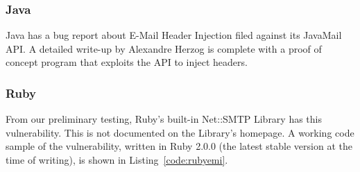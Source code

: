 \subsubsection{Java} 
Java has a bug report about E-Mail Header Injection filed against its JavaMail API. A detailed write-up by Alexandre Herzog \cite{Herzog.2014} is complete with a proof of concept program that exploits the API to inject headers.

\subsubsection{Ruby}
From our preliminary testing, Ruby's built-in Net::SMTP Library has this vulnerability. This is not documented on the Library's homepage.
A working code sample of the vulnerability, written in Ruby 2.0.0 (the latest stable version at the time of writing), is shown in Listing~\ref{code:rubyemi}.



